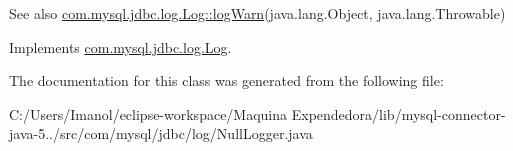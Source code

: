 \begin{DoxySeeAlso}{See also}
\mbox{\hyperlink{interfacecom_1_1mysql_1_1jdbc_1_1log_1_1_log_aa37a430b8cd7d66bb3ff46cb87e060f3}{com.\+mysql.\+jdbc.\+log.\+Log\+::log\+Warn}}(java.\+lang.\+Object, java.\+lang.\+Throwable) 
\end{DoxySeeAlso}


Implements \mbox{\hyperlink{interfacecom_1_1mysql_1_1jdbc_1_1log_1_1_log_a04d875e95d9a1d35f305da5ca20219a3}{com.\+mysql.\+jdbc.\+log.\+Log}}.



The documentation for this class was generated from the following file\+:\begin{DoxyCompactItemize}
\item 
C\+:/\+Users/\+Imanol/eclipse-\/workspace/\+Maquina Expendedora/lib/mysql-\/connector-\/java-\/5../src/com/mysql/jdbc/log/Null\+Logger.\+java\end{DoxyCompactItemize}
